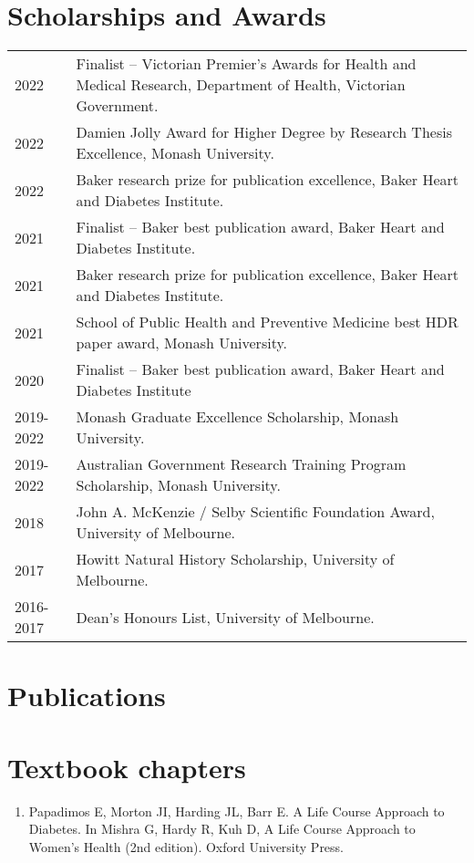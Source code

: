 \documentclass[11pt]{article}
\begin{document}
\section*{Scholarships and Awards}
\begin{tabular}{p{2cm}p{14cm}}
2022 & Finalist – Victorian Premier's Awards for Health and Medical Research, Department of Health, Victorian Government. \\
2022 & Damien Jolly Award for Higher Degree by Research Thesis Excellence, Monash University. \\
2022 & Baker research prize for publication excellence, Baker Heart and Diabetes Institute. \\
2021 & Finalist – Baker best publication award, Baker Heart and Diabetes Institute. \\
2021 & Baker research prize for publication excellence, Baker Heart and Diabetes Institute. \\
2021 & School of Public Health and Preventive Medicine best HDR paper award, Monash University. \\
2020 & Finalist – Baker best publication award, Baker Heart and Diabetes Institute \\
2019-2022 & Monash Graduate Excellence Scholarship, Monash University. \\
2019-2022 & Australian Government Research Training Program Scholarship, Monash University. \\
2018 & John A. McKenzie / Selby Scientific Foundation Award, University of Melbourne. \\
2017 & Howitt Natural History Scholarship, University of Melbourne. \\
2016-2017 & Dean's Honours List, University of Melbourne. \\
\end{tabular}


\clearpage
\section*{Publications}

\clearpage

\section*{Textbook chapters}
\begin{enumerate}
\item Papadimos E, Morton JI, Harding JL, Barr E. 
A Life Course Approach to Diabetes. 
In Mishra G, Hardy R, Kuh D, A Life Course Approach to Women's Health (2nd edition). 
Oxford University Press.  
\end{enumerate}
\end{document}
